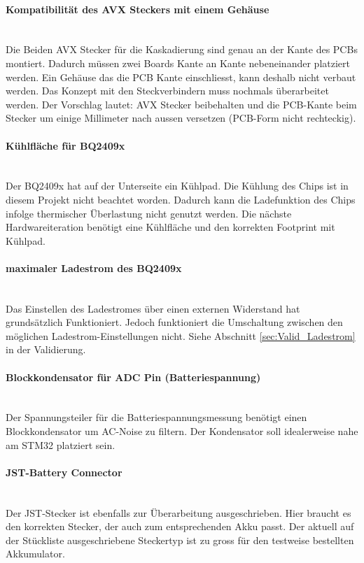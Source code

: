 \paragraph{Kompatibilität des AVX Steckers mit einem Gehäuse}\vspace{-0.3cm}\\
Die Beiden AVX Stecker für die Kaskadierung sind genau an der Kante des PCBs montiert. Dadurch müssen zwei Boards Kante an Kante nebeneinander platziert werden.
Ein Gehäuse das die PCB Kante einschliesst, kann deshalb nicht verbaut werden.
Das Konzept mit den Steckverbindern muss nochmals überarbeitet werden.
Der Vorschlag lautet: AVX Stecker beibehalten und die PCB-Kante beim Stecker um einige Millimeter nach aussen versetzen (PCB-Form nicht rechteckig).
\\
\paragraph{Kühlfläche für BQ2409x}\vspace{-0.3cm}\\
Der BQ2409x hat auf der Unterseite ein Kühlpad. Die Kühlung des Chips ist in diesem Projekt nicht beachtet worden. Dadurch kann die Ladefunktion des Chips infolge thermischer Überlastung nicht genutzt werden. Die nächste Hardwareiteration benötigt eine Kühlfläche und den korrekten Footprint mit Kühlpad.
\\
\paragraph{maximaler Ladestrom des BQ2409x}\vspace{-0.3cm}\\
Das Einstellen des Ladestromes über einen externen Widerstand hat grundsätzlich Funktioniert. Jedoch funktioniert die Umschaltung zwischen den möglichen Ladestrom-Einstellungen nicht.
Siehe Abschnitt \ref{sec:Valid_Ladestrom} in der Validierung.
\\
\paragraph{Blockkondensator für ADC Pin (Batteriespannung)}\vspace{-0.3cm}\\
Der Spannungsteiler für die Batteriespannungsmessung benötigt einen Blockkondensator um AC-Noise zu filtern. Der Kondensator soll idealerweise nahe am STM32 platziert sein.
\\
\paragraph{JST-Battery Connector}\vspace{-0.3cm}\\
Der JST-Stecker ist ebenfalls zur Überarbeitung ausgeschrieben. Hier braucht es den korrekten Stecker, der auch zum entsprechenden Akku passt. 
Der aktuell auf der Stückliste ausgeschriebene Steckertyp ist zu gross für den testweise bestellten Akkumulator.
\\
